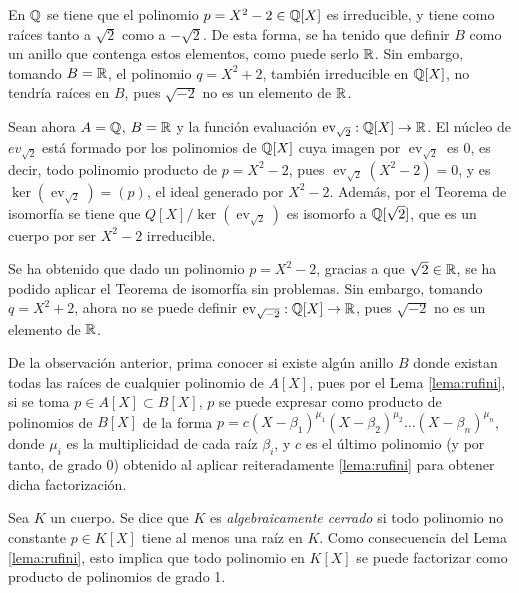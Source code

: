\begin{obss}
    \item En $\mathbb{Q}$ se tiene que el polinomio $p = X^2 - 2 \in \mathbb{Q}[X]$ es irreducible, y tiene como raíces tanto a $\sqrt{2}$ como a $-\sqrt{2}$. De esta forma, se ha tenido que definir $B$ como un anillo que contenga estos elementos, como puede serlo $\mathbb{R}$. Sin embargo, tomando $B = \mathbb{R}$, el polinomio $q = X^2 + 2$, también irreducible en $\mathbb{Q}[X]$, no tendría raíces en $B$, pues $\sqrt{-2}$ no es un elemento de $\mathbb{R}$.

    \item Sean ahora $A=\mathbb{Q}$, $B= \mathbb{R}$ y la función evaluación $\operatorname{ev}_{\sqrt{2}}: \mathbb{Q}[X] \to \mathbb{R}$. El núcleo de ${ev}_{\sqrt{2}}$ está formado por los polinomios de $\mathbb{Q}[X]$ cuya imagen por $\operatorname{ev}_{\sqrt{2}}$ es $0$, es decir, todo polinomio producto de $p = X^2-2$, pues $\operatorname{ev}_{\sqrt{2}} (X^2-2) = 0$, y es $\ker(\operatorname{ev}_{\sqrt{2}}) = (p)$, el ideal generado por $X^2-2$. Además, por el Teorema de isomorfía se tiene que $Q[X]/\ker(\operatorname{ev}_{\sqrt{2}})$ es isomorfo a $\mathbb{Q}[\sqrt{2}]$, que es un cuerpo por ser $X^2-2$ irreducible.
    
    Se ha obtenido que dado un polinomio $p = X^2 - 2$, gracias a que $\sqrt{2}\in \mathbb{R}$, se ha podido aplicar el Teorema de isomorfía sin problemas. Sin embargo, tomando $q = X^2 + 2$, ahora no se puede definir $\operatorname{ev}_{\sqrt{-2}}: \mathbb{Q}[X] \to \mathbb{R}$, pues $\sqrt{-2}$ no es un elemento de $\mathbb{R}$.
\end{obss}

De la observación anterior, prima conocer si existe algún anillo $B$ donde existan todas las raíces de cualquier polinomio de $A[X]$, pues por el Lema \ref{lema:rufini}, si se toma $p\in A[X] \subset B[X]$, $p$ se puede expresar como producto de polinomios de $B[X]$ de la forma $p = c(X-\beta_1)^{\mu_1}(X-\beta_2)^{\mu_2}\ldots(X-\beta_n)^{\mu_n}$, donde $\mu_i$ es la multiplicidad de cada raíz $\beta_i$, y $c$ es el último polinomio (y por tanto, de grado 0) obtenido al aplicar reiteradamente \ref{lema:rufini} para obtener dicha factorización.

\begin{deff}{\cite[p.~91]{Rosenberger}}
Sea $K$ un cuerpo. Se dice que $K$ es \textit{algebraicamente cerrado} si todo polinomio no constante $p \in K[X]$ tiene al menos una raíz en $K$. Como consecuencia del Lema \ref{lema:rufini}, esto implica que todo polinomio en $K[X]$ se puede factorizar como producto de polinomios de grado 1.
\end{deff}

